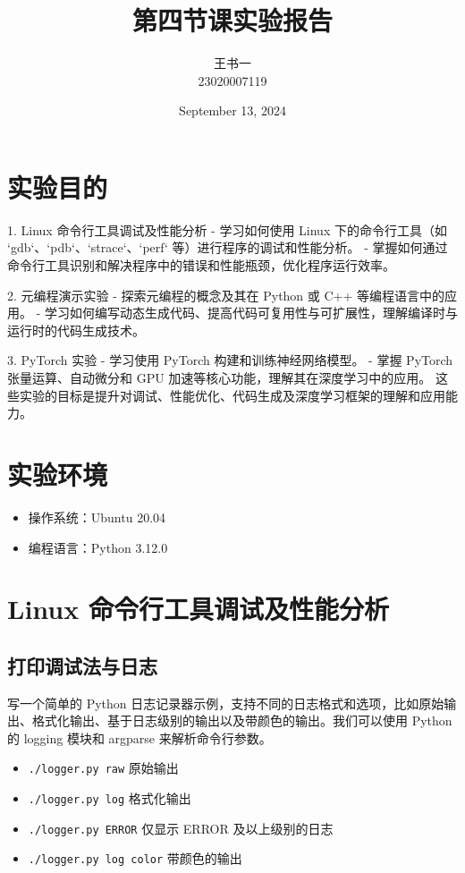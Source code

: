 \documentclass[a4paper, 12pt]{article}
\begin{document}
  \title{第四节课实验报告}
  \author{王书一 \\ 23020007119}
  \date{September 13, 2024}
  \maketitle

 \tableofcontents
 \newpage

  
  \section{实验目的}
1. Linux 命令行工具调试及性能分析
   - 学习如何使用 Linux 下的命令行工具（如 `gdb`、`pdb`、`strace`、`perf` 等）进行程序的调试和性能分析。
   - 掌握如何通过命令行工具识别和解决程序中的错误和性能瓶颈，优化程序运行效率。

2. 元编程演示实验
   - 探索元编程的概念及其在 Python 或 C++ 等编程语言中的应用。
   - 学习如何编写动态生成代码、提高代码可复用性与可扩展性，理解编译时与运行时的代码生成技术。

3. PyTorch 实验
   - 学习使用 PyTorch 构建和训练神经网络模型。
   - 掌握 PyTorch 张量运算、自动微分和 GPU 加速等核心功能，理解其在深度学习中的应用。
这些实验的目标是提升对调试、性能优化、代码生成及深度学习框架的理解和应用能力。
  
\section{实验环境}
\begin{itemize}
    \item 操作系统：Ubuntu 20.04
   \item 编程语言：Python 3.12.0
\end{itemize}

\section{ Linux 命令行工具调试及性能分析}

\subsection{打印调试法与日志}


写一个简单的 Python 日志记录器示例，支持不同的日志格式和选项，比如原始输出、格式化输出、基于日志级别的输出以及带颜色的输出。我们可以使用 Python 的 logging 模块和 argparse 来解析命令行参数。

\begin{itemize} 
    \item \texttt{./logger.py raw}    原始输出
    \item \texttt{./logger.py log}   格式化输出   
    \item \texttt{./logger.py ERROR}   仅显示 ERROR 及以上级别的日志 
    \item \texttt{./logger.py log color}       带颜色的输出
\end{itemize}
\end{document}

